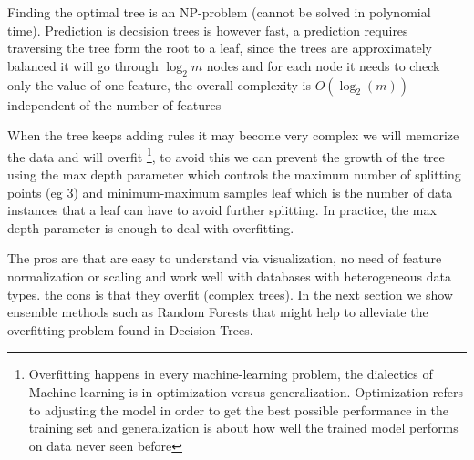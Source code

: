\documentclass[11pt]{article}
\begin{document}
Finding the optimal tree is an NP-problem (cannot be solved in polynomial time). Prediction is decsision trees is however fast, a prediction requires traversing the tree form the root to a leaf, since the trees are approximately balanced it will go through $\log_2m$ nodes and for each node it needs to check only the value of one feature, the overall complexity is $O(\log_2(m))$ independent of the number of features

When the tree keeps adding rules it may become very complex we will memorize the data and will overfit \footnote{Overfitting happens in every machine-learning problem, the dialectics of Machine learning is in optimization versus generalization. Optimization refers to adjusting the model in order to get the best possible performance in the training set and generalization is about how well the trained model performs on data never seen before}, to avoid this we can prevent the growth of the tree using the max depth parameter which controls the maximum number of splitting points (eg 3) and minimum-maximum samples leaf which is the number of data instances that a leaf can have to avoid further splitting. In practice, the max depth parameter is enough to deal with overfitting.

The pros are that are easy to understand via visualization, no need of feature normalization or scaling and work well with databases with heterogeneous data types. the cons is that they overfit (complex trees). In the next section we show ensemble methods such as Random Forests that might help to alleviate the overfitting problem found in Decision Trees.
\end{document}
